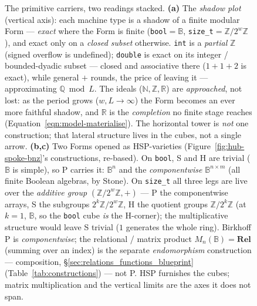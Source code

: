 \documentclass[11pt, a4paper]{article}
\begin{document}
\begin{figure}[htbp]
\caption{The primitive carriers, two readings stacked.  \textbf{(a)} The \emph{shadow plot} (vertical axis): each machine type is a shadow of a finite modular Form --- \emph{exact} where the Form is finite (\texttt{bool}$=\mathbb{B}$, \texttt{size\_t}$=\mathbb{Z}/2^{w}\mathbb{Z}$), and exact only on a \emph{closed subset} otherwise.  \texttt{int} is a \emph{partial} $\mathbb{Z}$ (signed overflow is undefined); \texttt{double} is exact on its integer / bounded-dyadic subset --- closed and associative there ($1+1+2$ is exact), while general $+$ rounds, the price of leaving it --- approximating $\mathbb{Q}\bmod L$.  The ideals ($\mathbb{N},\mathbb{Z},\mathbb{R}$) are \emph{approached}, not lost: as the period grows ($w,L\to\infty$) the Form becomes an ever more faithful shadow, and $\mathbb{R}$ is the \emph{completion} no finite stage reaches (Equation~\ref{eqn:model-materialise}).  The horizontal tower is \emph{not} one construction; that lateral structure lives in the cubes, not a single arrow.  \textbf{(b,c)} Two Forms opened as HSP-varieties (Figure~\ref{fig:hub-spoke-bnz}'s constructions, re-based).  On \texttt{bool}, S and H are trivial ($\mathbb{B}$ is simple), so P carries it: $\mathbb{B}^{n}$ and the \emph{componentwise} $\mathbb{B}^{n\times m}$ (all finite Boolean algebras, by Stone).  On \texttt{size\_t} all three legs are live over the \emph{additive group} $(\mathbb{Z}/2^{w}\mathbb{Z},+)$ --- P the componentwise arrays, S the subgroups $2^{k}\mathbb{Z}/2^{w}\mathbb{Z}$, H the quotient groups $\mathbb{Z}/2^{k}\mathbb{Z}$ (at $k=1$, $\mathbb{B}$, so the \texttt{bool} cube \emph{is} the H-corner); the multiplicative structure would leave S trivial ($1$ generates the whole ring).  Birkhoff P is \emph{componentwise}; the relational / matrix product $M_n(\mathbb{B})=\mathbf{Rel}$ (summing over an index) is the separate \emph{endomorphism} construction --- composition, \S\ref{sec:relations_functions_blueprint} (Table~\ref{tab:constructions}) --- not P.  HSP furnishes the cubes; matrix multiplication and the vertical limits are the axes it does not span.}
\label{fig:primitive-reconciliation}
\end{figure}
\end{document}
